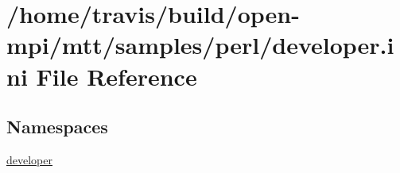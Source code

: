 \hypertarget{developer_8ini}{\section{/home/travis/build/open-\/mpi/mtt/samples/perl/developer.ini File Reference}
\label{developer_8ini}
}
\subsection*{Namespaces}
\begin{DoxyCompactItemize}
\item 
\hyperlink{namespacedeveloper}{developer}
\end{DoxyCompactItemize}
